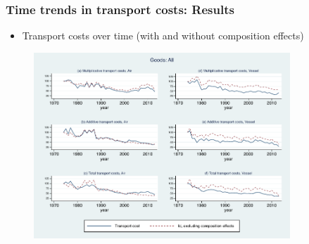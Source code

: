 \documentclass[10 pt,Helvetica, french]{beamer}
\begin{document}
\begin{frame}[label = slide_compeffects_figure]
\frametitle{Time trends in transport costs: Results}
\begin{itemize}
\item Transport costs over time (with and without composition effects)
\end{itemize}

\begin{figure}[htbp]
\begin{center}
\includegraphics[height=7cm]
{graph_composition_all.pdf}
\end{center}
\end{figure}
\hyperlink{app_compeffects_Hummels_rob}{} \hyperlink{slide_compeffects_results}{}
\end{frame}
\end{document}
